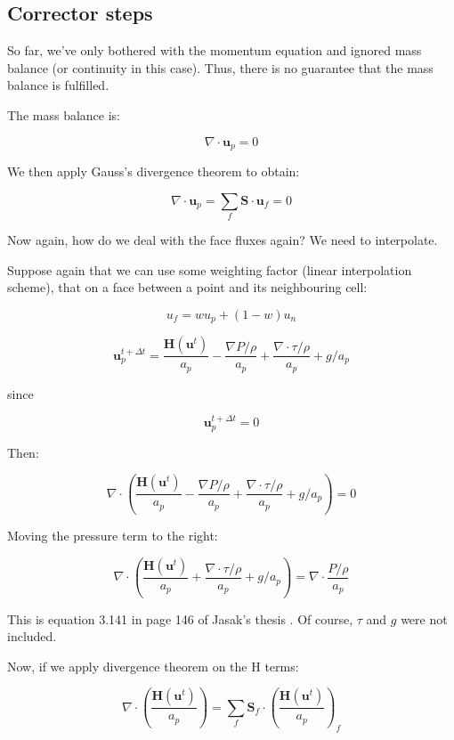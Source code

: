 \documentclass[masters]{ucbthesis}
\renewcommand{\_}{\kern-1.5pt\textunderscore\kern-1.5pt}
\begin{document}
\subsection{Corrector steps}

So far, we've only bothered with the momentum equation and ignored 
mass balance (or continuity in this case). Thus, there is 
no guarantee that the mass balance is fulfilled.

The mass balance is:

$$\nabla \cdot \textbf{u}_p = 0$$

We then apply Gauss's divergence theorem to obtain:

$$\nabla \cdot \textbf{u}_p = \sum_f \textbf{S} \cdot \textbf{u}_f = 0$$

Now again, how do we deal with the face fluxes again?
We need to interpolate.

Suppose again that we can use some weighting factor (linear 
interpolation scheme), that on a face between a point and its neighbouring 
cell:

$$ u_f = w u_p + (1-w) u_n $$


\begin{equation*}
	\textbf{u}_p^{t + \Delta t} = \frac{\textbf{H}(\textbf{u}^t)}{a_p}
	- \frac{\nabla P/\rho}{a_p}
	+ \frac{\nabla \cdot \tau /\rho}{a_p}
	+ g/a_p
\end{equation*}

since

\begin{equation*}
	\textbf{u}_p^{t + \Delta t} = 0
\end{equation*}

Then:


$$\nabla \cdot 
\left( 
	\frac{\textbf{H}(\textbf{u}^t)}{a_p}
	- \frac{\nabla P/\rho}{a_p}
	+ \frac{\nabla \cdot \tau /\rho}{a_p}
	+ g/a_p
\right)
=  0$$

Moving the pressure term to the right:

$$\nabla \cdot 
\left( 
	\frac{\textbf{H}(\textbf{u}^t)}{a_p}
	+ \frac{\nabla \cdot \tau /\rho}{a_p}
	+ g/a_p
\right)
=  \nabla \cdot \frac{P/\rho}{a_p}
$$


This is equation 3.141 in page 146 of Jasak's thesis \citep{jasak1996error}.
Of course, $\tau$ and $g$ were not included.

Now, if we apply divergence theorem on the H terms:

$$\nabla \cdot 
\left( 
	\frac{\textbf{H}(\textbf{u}^t)}{a_p}
\right)
=  
\sum_f \textbf{S}_f \cdot
\left( 
	\frac{\textbf{H}(\textbf{u}^t)}{a_p}
\right)_f
$$
\end{document}
